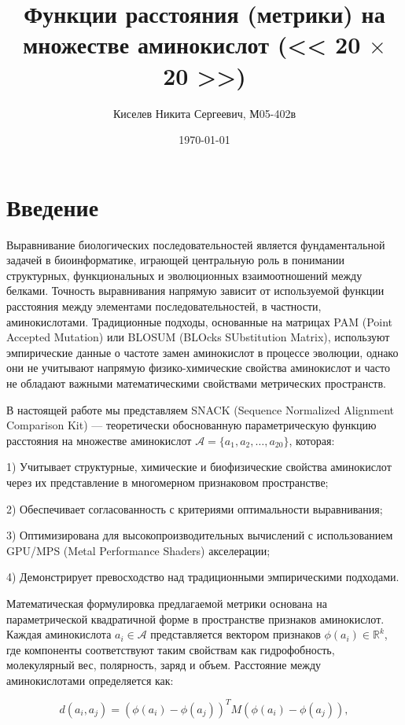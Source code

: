 \documentclass[12pt]{article}
\title{Функции расстояния (метрики) на множестве аминокислот (<< 20 $\times$ 20 >>)}
\author{Киселев Никита Сергеевич, М05-402в}
\date{\today}
\begin{document}
\maketitle

\section{Введение}

Выравнивание биологических последовательностей является фундаментальной задачей в биоинформатике, играющей центральную роль в понимании структурных, функциональных и эволюционных взаимоотношений между белками. Точность выравнивания напрямую зависит от используемой функции расстояния между элементами последовательностей, в частности, аминокислотами. Традиционные подходы, основанные на матрицах PAM (Point Accepted Mutation) или BLOSUM (BLOcks SUbstitution Matrix), используют эмпирические данные о частоте замен аминокислот в процессе эволюции, однако они не учитывают напрямую физико-химические свойства аминокислот и часто не обладают важными математическими свойствами метрических пространств.

В настоящей работе мы представляем SNACK (Sequence Normalized Alignment Comparison Kit) — теоретически обоснованную параметрическую функцию расстояния на множестве аминокислот $\mathcal{A} = \{a_1, a_2, \dots, a_{20}\}$, которая:

1) Учитывает структурные, химические и биофизические свойства аминокислот через их представление в многомерном признаковом пространстве;

2) Обеспечивает согласованность с критериями оптимальности выравнивания;

3) Оптимизирована для высокопроизводительных вычислений с использованием GPU/MPS (Metal Performance Shaders) акселерации;

4) Демонстрирует превосходство над традиционными эмпирическими подходами.

Математическая формулировка предлагаемой метрики основана на параметрической квадратичной форме в пространстве признаков аминокислот. Каждая аминокислота $a_i \in \mathcal{A}$ представляется вектором признаков $\phi(a_i) \in \mathbb{R}^k$, где компоненты соответствуют таким свойствам как гидрофобность, молекулярный вес, полярность, заряд и объем. Расстояние между аминокислотами определяется как:

\begin{equation}
d(a_i, a_j) = (\phi(a_i) - \phi(a_j))^T M (\phi(a_i) - \phi(a_j)),
\end{equation}
\end{document}
